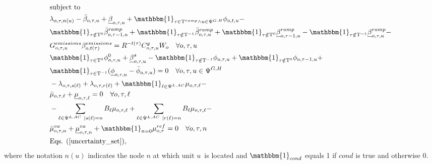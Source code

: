 \documentclass[final]{IEEEtran}
\newcommand{\Tau}{\mathrm{T}}
\begin{document}
\begin{align}
&\text{subject to} \nonumber \\
&\lambda_{o, \tau, n(u)} - \bar{\beta}_{o, \tau, u} + \underline{\beta}_{o, \tau, u} + \mathbbm{1}_{\tau \in \Tau^{ramp} \land u \in \Psi^{G, H}} \phi_{o, t, u} - \nonumber \\
&\mathbbm{1}_{\tau \notin \Tau^0} \bar{\beta}_{o, \tau - 1, u}^{ramp} + \mathbbm{1}_{\tau \notin \Tau^{-1}} \bar{\beta}_{o, \tau, u}^{ramp} + \mathbbm{1}_{\tau \notin \Tau^0} \underline{\beta}_{o, \tau - 1, u}^{ramp} - \mathbbm{1}_{\tau \notin \Tau^{-1}} \underline{\beta}_{o, \tau, u}^{ramp} - \nonumber \\
&\label{sub_constr1}G_{o, \tau, u}^{emissions} \beta_{o, t(\tau)}^{emissions} = R^{-t(\tau)} C^g_{o, \tau, u}  W_o \quad \forall o, \tau, u \\
&\mathbbm{1}_{\tau \in \Tau^0} \phi_{o, \tau, u}^{0} + \underline{\beta}_{o, \tau, u}^s - \mathbbm{1}_{\tau \notin \Tau^{-1}} \phi_{o, \tau, u} + \mathbbm{1}_{\tau \notin \Tau^0} \phi_{o, \tau - 1, u} + \nonumber \\
&\mathbbm{1}_{\tau \in \Tau^{-1}} (\underline{\phi}_{o, \tau, u} - \bar{\phi}_{o, \tau, u}) = 0 \quad \forall o, \tau, u \in \Psi^{G, H} \\
&-\lambda_{o, \tau, s(\ell)} + \lambda_{o, \tau, r(\ell)} + \mathbbm{1}_{\ell \in \Psi^{L,AC}} \mu_{o, \tau, \ell} - \nonumber \\
&\bar{\mu}_{o, \tau, \ell} + \underline{\mu}_{o, \tau, \ell} = 0 \quad \forall o, \tau, \ell \\
&-\sum\limits_{\ell \in \Psi^{L,AC} | s(\ell) = n} B_\ell \mu_{o, \tau, \ell} + \sum\limits_{\ell \in \Psi^{L,AC} | r(\ell) = n} B_\ell \mu_{o, \tau, \ell} - \nonumber \\
&\bar{\mu}^{va}_{o, \tau, n} + \underline{\mu}^{va}_{o, \tau, n} + \mathbbm{1}_{n = 0} \mu^{ref}_{o, \tau} = 0 \quad \forall o, \tau, n \\
&\label{sub_last}\text{Eqs. } (\ref{uncertainty_set}),
\end{align}
where the notation $n(u)$ indicates the node $n$ at which unit $u$ is located and $\mathbbm{1}_{cond}$ equals 1 if $cond$ is true and otherwise 0.
\end{document}
